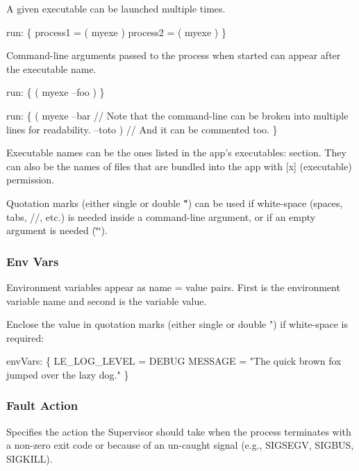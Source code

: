 A given executable can be launched multiple times. 
\begin{DoxyCode}
run:
\{
    process1 = ( myexe )
    process2 = ( myexe )
\}
\end{DoxyCode}


Command-\/line arguments passed to the process when started can appear after the executable name. 
\begin{DoxyCode}
run:
\{
    ( myexe --foo )
\}
\end{DoxyCode}



\begin{DoxyCode}
run:
\{
    ( myexe --bar  \textcolor{comment}{// Note that the command-line can be broken into multiple lines for readability.}
            --toto ) \textcolor{comment}{// And it can be commented too.}
\}
\end{DoxyCode}


Executable names can be the ones listed in the app’s {\ttfamily executables\+:} section. They can also be the names of files that are bundled into the app with {\ttfamily \mbox{[}x\mbox{]}} (executable) permission.

Quotation marks (either single {\bfseries \textquotesingle{}} or double {\bfseries "}) can be used if white-\/space (spaces, tabs, {\ttfamily //}, etc.) is needed inside a command-\/line argument, or if an empty argument is needed (\char`\"{}\char`\"{}).\hypertarget{def_files_adef_defFilesAdef_processEnvVars}{}\subsubsection{Env Vars}\label{def_files_adef_defFilesAdef_processEnvVars}
Environment variables appear as name = value pairs. First is the environment variable name and second is the variable value.

Enclose the value in quotation marks (either single \textquotesingle{} or double ") if white-\/space is required\+:


\begin{DoxyCode}
envVars:
\{
    LE\_LOG\_LEVEL = DEBUG
    MESSAGE = \textcolor{stringliteral}{"The quick brown fox jumped over the lazy dog."}
\}
\end{DoxyCode}
\hypertarget{def_files_adef_defFilesAdef_processFaultAction}{}\subsubsection{Fault Action}\label{def_files_adef_defFilesAdef_processFaultAction}
Specifies the action the Supervisor should take when the process terminates with a non-\/zero exit code or because of an un-\/caught signal (e.\+g., S\+I\+G\+S\+E\+G\+V, S\+I\+G\+B\+U\+S, S\+I\+G\+K\+I\+L\+L).

